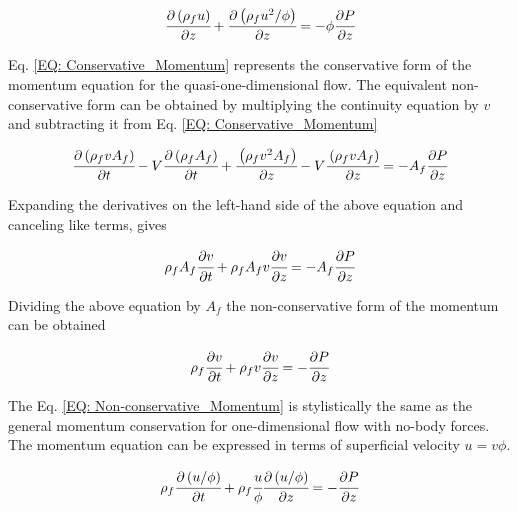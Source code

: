 \documentclass[../Article_Model_Parameters.tex]{subfiles}
\begin{document}
	{\footnotesize
		\begin{equation}
			\cfrac{\partial \left( \rho_f u \right)}{\partial z} + \cfrac{\partial \left( \rho_f u^2/\phi \right) }{\partial z} = -\phi \cfrac{\partial 	P}{\partial z}
		\end{equation}
	}

	Eq. \ref{EQ: Conservative_Momentum} represents the conservative form of the momentum equation for the quasi-one-dimensional flow. The equivalent non-conservative form can be obtained by multiplying the continuity equation by $v$ and subtracting it from Eq. \ref{EQ: Conservative_Momentum}
	
	{\footnotesize
		\begin{equation}
			\cfrac{\partial \left( \rho_f v A_f \right)}{\partial t} - V\cfrac{ \partial \left( \rho_f A_f \right) }{\partial t} + \cfrac{\left( \rho_f v^2 A_f 	\right)}{\partial z} - V \cfrac{\left( \rho_f v A_f \right)}{\partial z} = -A_f \cfrac{\partial P}{\partial z}
		\end{equation}
	}
	
	Expanding the derivatives on the left-hand side of the above equation and canceling like terms, gives

	{\footnotesize
		\begin{equation}
			\rho_f A_f \cfrac{\partial v}{\partial t} + \rho_f A_f v \cfrac{\partial v}{\partial z} = -A_f \cfrac{\partial P}{\partial z}
		\end{equation}
	}

	Dividing the above equation by $A_f$ the non-conservative form of the momentum can be obtained
	
	{\footnotesize
		\begin{equation}
			\rho_f \cfrac{\partial v}{\partial t} + \rho_f v \cfrac{\partial v}{\partial z} = -\cfrac{\partial P}{\partial z}
			\label{EQ: Non-conservative_Momentum}
		\end{equation}
	}

	The Eq. \ref{EQ: Non-conservative_Momentum} is stylistically the same as the general momentum conservation for one-dimensional flow with no-body forces. The momentum equation can be expressed in terms of superficial velocity $u=v\phi$. 
	
	{\footnotesize
		\begin{equation}
			\rho_f \cfrac{\partial \left(u / \phi \right)}{\partial t} + \rho_f \cfrac{u}{\phi} \cfrac{\partial \left( u / \phi \right)}{\partial z} = - \cfrac{\partial P}{\partial z}
		\end{equation}
	}
\end{document}
